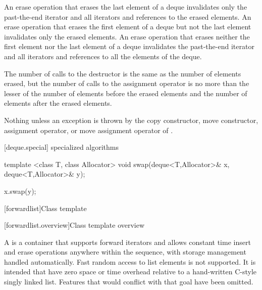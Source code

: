 \begin{itemdescr}
\pnum
\effects
An erase operation that erases the last element of a deque invalidates only the past-the-end iterator
and all iterators and references to the erased elements. An erase operation that erases the first
element of a deque but not the last element invalidates only the erased elements. An erase operation
that erases neither the first element nor the last element of a deque invalidates the past-the-end
iterator and all iterators and references to all the elements of the deque.

\pnum
\complexity
The number of calls to the destructor is the same as the
number of elements erased, but the number of calls to the assignment operator is
no more than the lesser of the number of elements before the erased elements and the number of elements after the erased elements.

\pnum
\throws
Nothing unless an exception is thrown by the copy constructor, move constructor,
assignment operator, or move assignment operator of
.
\end{itemdescr}

[deque.special]{ specialized algorithms}

%
%
\begin{itemdecl}
template <class T, class Allocator>
  void swap(deque<T,Allocator>& x, deque<T,Allocator>& y);
\end{itemdecl}

\begin{itemdescr}
\pnum
\effects
\begin{codeblock}
x.swap(y);
\end{codeblock}
\end{itemdescr}

[forwardlist]{Class template }

[forwardlist.overview]{Class template  overview}

\pnum
A  is a container that supports forward iterators and allows
constant time insert and erase operations anywhere within the sequence, with storage
management handled automatically. Fast random access to list elements is not supported.
\enternote It is intended that  have zero space or time overhead
relative to a hand-written C-style singly linked list. Features that would conflict with
that goal have been omitted.\exitnote

